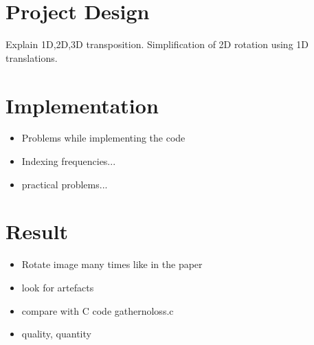 \documentclass[]{usiinfbachelorproject}
\begin{document}
	\section{Project Design}
	Explain 1D,2D,3D transposition.
	Simplification of 2D rotation using 1D translations.
	
	
	
	\section{Implementation}
	\begin{itemize}
		\item Problems while implementing the code
		\item Indexing frequencies...
		\item practical problems...
	\end{itemize}
	
	\section{Result}
	
	
	\begin{itemize}
		\item Rotate image many times like in the paper
		\item look for artefacts
		\item compare with C code gathernoloss.c
		\item quality, quantity
	\end{itemize}
	
	
	
	
	
\end{document}
